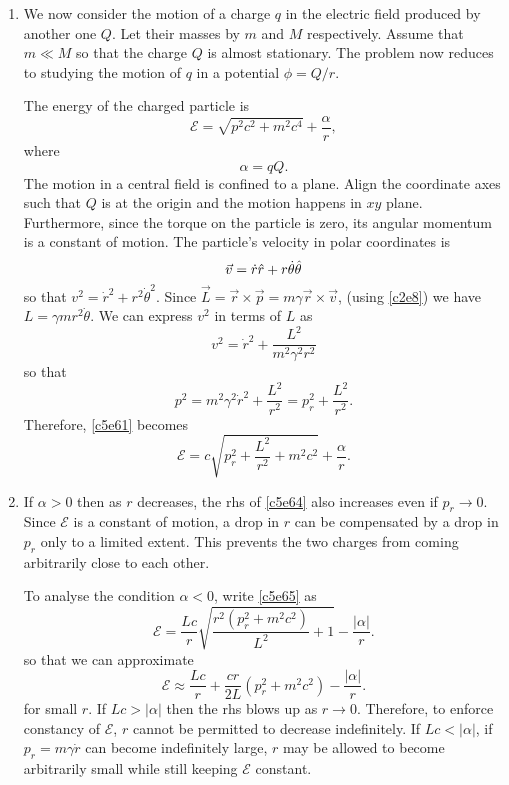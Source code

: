 \begin{enumerate}
\item We now consider the motion of a charge $q$ in the electric field produced
by another one $Q$. Let their masses by $m$ and $M$ respectively. Assume that
$m \ll M$ so that the charge $Q$ is almost stationary. The problem now reduces 
to studying the motion of $q$ in a potential $\phi = Q/r$.

The energy of the charged particle is
\begin{equation}\label{c5e61}
\mathcal{E} = \sqrt{p^2c^2 + m^2c^4} + \frac{\alpha}{r},
\end{equation}
where
\begin{equation}\label{c5e62}
\alpha = qQ.
\end{equation}
The motion in a central field is confined to a plane. Align the coordinate axes
such that $Q$ is at the origin and the motion happens in $xy$ plane. 
Furthermore, since the torque on the particle is zero, its angular momentum is 
a constant of motion. The particle's velocity in polar coordinates is
\begin{equation}\label{c5e63}
\vec{v} = \dot{r}\hat{r} + r\dot{\theta}\hat{\theta}
\end{equation}
so that $v^2 = \dot{r}^2 + r^2\dot{\theta}^2$. Since $\vec{L} = \vec{r} \times
\vec{p} = m\gamma\vec{r} \times \vec{v}$, (using \eqref{c2e8}) we have $L = 
\gamma mr^2\dot{\theta}$. We can express $v^2$ in terms of $L$ as
\[
v^2 = \dot{r}^2 + \frac{L^2}{m^2\gamma^2 r^2}
\]
so that
\begin{equation}\label{c5e64}
p^2 = m^2\gamma^2\dot{r}^2 + \frac{L^2}{r^2} = p_r^2 + \frac{L^2}{r^2}.
\end{equation}
Therefore, \eqref{c5e61} becomes
\begin{equation}\label{c5e65}
\mathcal{E} = c\sqrt{p_r^2 + \frac{L^2}{r^2} + m^2c^2} + \frac{\alpha}{r}.
\end{equation}

\item If $\alpha > 0$ then as $r$ decreases, the rhs of \eqref{c5e64} also
increases even if $p_r \rightarrow 0$. Since $\mathcal{E}$ is a constant of
motion, a drop in $r$ can be compensated by a drop in $p_r$ only to a limited
extent. This prevents the two charges from coming arbitrarily close to each 
other.

To analyse the condition $\alpha < 0$, write \eqref{c5e65} as
\[
\mathcal{E} = \frac{Lc}{r}\sqrt{\frac{r^2(p_r^2 + m^2c^2)}{L^2} + 1} - 
\frac{|\alpha|}{r}.
\]
so that we can approximate
\[
\mathcal{E} \approx \frac{Lc}{r} + \frac{cr}{2L}(p_r^2 + m^2c^2) - 
\frac{|\alpha|}{r}.
\]
for small $r$. If $Lc > |\alpha|$ then the rhs blows up as $r \rightarrow 0$. 
Therefore, to enforce constancy of $\mathcal{E}$, $r$ cannot be permitted to
decrease indefinitely. If $Lc < |\alpha|$, if $p_r = m\gamma\dot{r}$ can become
indefinitely large, $r$ may be allowed to become arbitrarily small while still
keeping $\mathcal{E}$ constant.


\end{enumerate}
